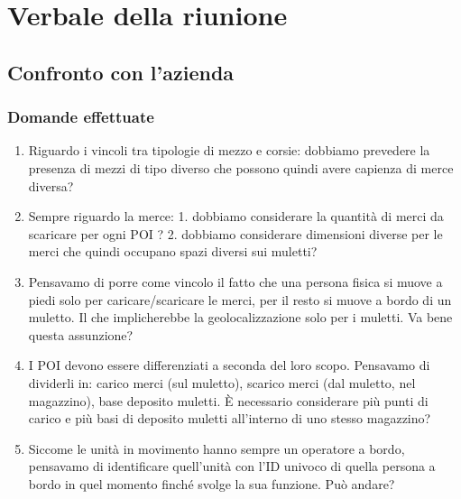 \section{Verbale della riunione}

\subsection{Confronto con l'azienda}
\subsubsection{Domande effettuate}
\begin{enumerate}
	\item Riguardo i vincoli tra tipologie di mezzo e corsie: dobbiamo prevedere la presenza di mezzi di tipo diverso che possono quindi avere capienza di merce diversa? 
	
	\item Sempre riguardo la merce: 1. dobbiamo considerare la quantità di merci da scaricare per ogni POI ? 2. dobbiamo considerare dimensioni diverse per le merci che quindi occupano spazi diversi sui muletti? 
	
	\item Pensavamo di porre come vincolo il fatto che una persona fisica si muove a piedi solo per caricare/scaricare le merci, per il resto si muove a bordo di un muletto. Il che implicherebbe la geolocalizzazione solo per i muletti. Va bene questa assunzione? 
	
	\item I POI devono essere differenziati a seconda del loro scopo. Pensavamo di dividerli in: carico merci (sul muletto), scarico merci (dal muletto, nel magazzino), base deposito muletti. È necessario considerare più punti di carico e più basi di deposito muletti all'interno di uno stesso magazzino? 
	
	\item Siccome le unità in movimento hanno sempre un operatore a bordo, pensavamo di identificare quell'unità con l'ID univoco di quella persona a bordo in quel momento finché svolge la sua funzione. Può andare?
\end{enumerate}
